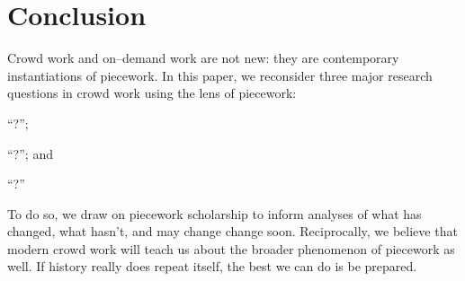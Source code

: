 \documentclass[trackingWork]{subfiles}
\begin{document}
\section{Conclusion}
Crowd work and on--demand work are not new: they are contemporary instantiations of piecework.
In this paper, we reconsider three major research questions in crowd work using the lens of piecework: \begin{inlinelist}
  \item ``?'';
  \item ``?'';
        and
  \item ``?''
\end{inlinelist}
To do so, we draw on piecework scholarship to inform analyses of what has changed, what hasn't, and may change change soon. 
Reciprocally, we believe that modern crowd work will teach us about the broader phenomenon of piecework as well.
If history really does repeat itself, the best we can do is be prepared.
\end{document}
